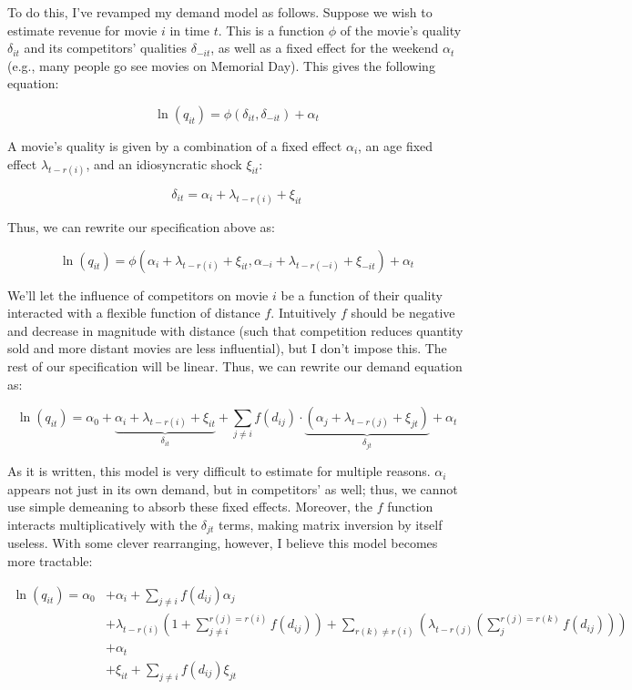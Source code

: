 \documentclass{article}
\begin{document}
To do this, I've revamped my demand model as follows. Suppose we wish to estimate revenue for movie $i$ in time $t$. This is a function $\phi$ of the movie's quality $\delta_{it}$ and its competitors' qualities $\delta_{-it}$, as well as a fixed effect for the weekend $\alpha_t$ (e.g., many people go see movies on Memorial Day). This gives the following equation:

$$\ln(q_{it}) = \phi(\delta_{it}, \delta_{-it}) + \alpha_t$$

A movie's quality is given by a combination of a fixed effect $\alpha_i$, an age fixed effect $\lambda_{t - r(i)}$, and an idiosyncratic shock $\xi_{it}$:

$$\delta_{it} = \alpha_i + \lambda_{t - r(i)} + \xi_{it}$$

Thus, we can rewrite our specification above as:

$$\ln(q_{it}) = \phi(\alpha_i + \lambda_{t - r(i)} + \xi_{it}, \alpha_{-i} + \lambda_{t - r(-i)} + \xi_{-it}) + \alpha_t$$

We'll let the influence of competitors on movie $i$ be a function of their quality interacted with a flexible function of distance $f$. Intuitively $f$ should be negative and decrease in magnitude with distance (such that competition reduces quantity sold and more distant movies are less influential), but I don't impose this. The rest of our specification will be linear. Thus, we can rewrite our demand equation as:

$$\ln(q_{it}) = \alpha_0 + \underbrace{\alpha_i + \lambda_{t - r(i)} + \xi_{it}}_{\delta_{it}} + \sum_{j \neq i} f(d_{ij}) \cdot \underbrace{(\alpha_j + \lambda_{t - r(j)} + \xi_{jt})}_{\delta_{jt}} + \alpha_t$$

As it is written, this model is very difficult to estimate for multiple reasons. $\alpha_i$ appears not just in its own demand, but in competitors' as well; thus, we cannot use simple demeaning to absorb these fixed effects. Moreover, the $f$ function interacts multiplicatively with the $\delta_{jt}$ terms, making matrix inversion by itself useless. With some clever rearranging, however, I believe this model becomes more tractable:

\begin{align*}
    \ln(q_{it}) = \alpha_0 &+ \alpha_i + \sum_{j \neq i} f(d_{ij}) \alpha_j \\
    &+ \lambda_{t - r(i)} \left(1 + \sum_{j \neq i}^{r(j) = r(i)} f(d_{ij})\right) + \sum_{r(k) \neq r(i)} \left(\lambda_{t - r(j)} \left(\sum_{j}^{r(j) = r(k)} f(d_{ij}) \right)\right) \\
    &+ \alpha_t \\
    &+ \xi_{it} + \sum_{j \neq i} f(d_{ij}) \xi_{jt}
\end{align*}
\end{document}
